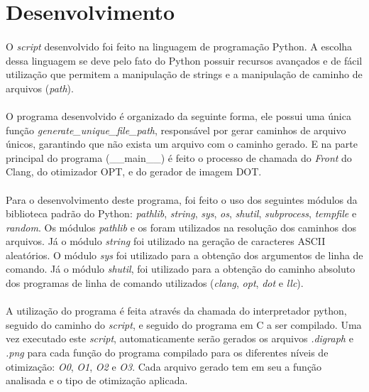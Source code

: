 \documentclass[12pt]{article}
\begin{document}
\section{Desenvolvimento}

\paragraph{}O \textit{script} desenvolvido foi feito na linguagem de programação Python. A escolha dessa linguagem se deve pelo fato do Python possuir recursos avançados e de fácil utilização que permitem a manipulação de strings e a manipulação de caminho de arquivos (\textit{path}).

\paragraph{}O programa desenvolvido é organizado da seguinte forma, ele possui uma única função \textit{generate\_unique\_file\_path}, responsável por gerar caminhos de arquivo únicos, garantindo que não exista um arquivo com o caminho gerado. E na parte principal do programa (\_\_main\_\_) é feito o processo de chamada do \textit{Front} do Clang, do otimizador OPT, e do gerador de imagem DOT.

\paragraph{}Para o desenvolvimento deste programa, foi feito o uso dos seguintes módulos da biblioteca padrão do Python: \textit{pathlib}, \textit{string}, \textit{sys}, \textit{os}, \textit{shutil}, \textit{subprocess}, \textit{tempfile} e \textit{random}. Os módulos \textit{pathlib} e os foram utilizados na resolução dos caminhos dos arquivos. Já o módulo \textit{string} foi utilizado na geração de caracteres ASCII aleatórios. O módulo \textit{sys} foi utilizado para a obtenção dos argumentos de linha de comando. Já o módulo \textit{shutil}, foi utilizado para a obtenção do caminho absoluto dos programas de linha de comando utilizados (\textit{clang}, \textit{opt}, \textit{dot} e \textit{llc}).

\paragraph{}A utilização do programa é feita através da chamada do interpretador python, seguido do caminho do \textit{script}, e seguido do programa em C a ser compilado. Uma vez executado este \textit{script}, automaticamente serão gerados os arquivos \textit{.digraph} e \textit{.png} para cada função do programa compilado para os diferentes níveis de otimização: \textit{O0}, \textit{O1}, \textit{O2} e \textit{O3}. Cada arquivo gerado tem em seu a função analisada e o tipo de otimização aplicada.
\end{document}

